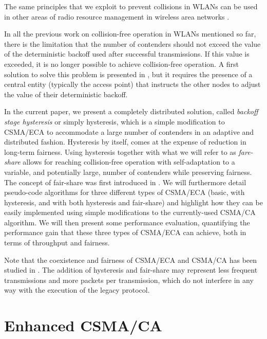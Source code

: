 \documentclass[conference]{IEEEtran}
\begin{document}
The same principles that we exploit to prevent collisions in WLANs can be used in other areas of radio resource management in wireless area networks \cite{duffy2011dcs,checco2012scs,checco2012lbc,khan2013aso}.

In all the previous work on collision-free operation in WLANs mentioned so far, there is the limitation that the number of contenders should not exceed the value of the deterministic backoff used after successful transmissions.
If this value is exceeded, it is no longer possible to achieve collision-free operation.
A first solution to solve this problem is presented in \cite{barcelo2011tcf}, but it requires the presence of a central entity (typically the access point) that instructs the other nodes to adjust the value of their deterministic backoff.

In the current paper, we present a completely distributed solution, called {\it backoff stage hysteresis} or simply hysteresis, which is a simple modification to CSMA/ECA to accommodate a large number of contenders in an adaptive and distributed fashion. Hysteresis by itself, comes at the expense of reduction in long-term fairness. Using hysteresis together with what we will refer to as {\it fare-share} allows for reaching collision-free operation with self-adaptation to a variable, and potentially large, number of contenders while preserving fairness. The concept of fair-share was first introduced in \cite{fang2011dlm}. We will furthermore detail pseudo-code algorithms for three different types of CSMA/ECA (basic, with hysteresis, and with both hysteresis and fair-share) and highlight how they can be easily implemented using simple modifications to the currently-used CSMA/CA algorithm. We will then present some performance evaluation, quantifying the performance gain that these three types of CSMA/ECA can achieve, both in terms of throughput and fairness. 

{Note that the coexistence and fairness of CSMA/ECA and CSMA/CA has been studied in \cite{barcelo2010fcc}. The addition of hysteresis and fair-share may represent less frequent transmissions and more packets per transmission, which do not interfere in any way with the execution of the legacy protocol.}


\section{Enhanced CSMA/CA}
\end{document}
